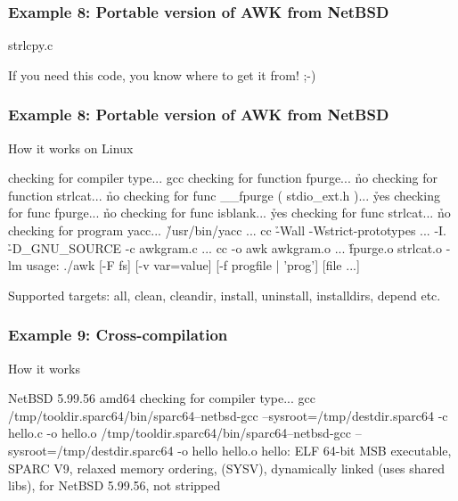 \documentclass[hyperref={colorlinks=true}]{beamer}
\begin{document}
\begin{frame}[fragile]
  \frametitle{Example 8: Portable version of AWK from NetBSD}

\begin{block}{strlcpy.c}
\begin{CodeNoLabel}
If you need this code, you know where to get it from! ;-)
\end{CodeNoLabel}
\end{block}
\end{frame}

\begin{frame}[fragile]
  \frametitle{Example 8: Portable version of AWK from NetBSD}

\begin{block}{How it works on Linux}
\begin{CodeNoLabel}
checking for compiler type... gcc
checking for function fpurge... \h{no}
checking for function strlcat... \h{no}
checking for func __fpurge ( stdio_ext.h )... \h{yes}
checking for func fpurge... \h{no}
checking for func isblank... \h{yes}
checking for func strlcat... \h{no}
checking for program yacc... \h{/usr/bin/yacc}
...
cc \h{-Wall -Wstrict-prototypes ...} 
    -I. \h{-D\_GNU\_SOURCE} -c awkgram.c
...
cc -o awk awkgram.o ... \h{fpurge.o strlcat.o} -lm
usage: ./awk [-F fs] [-v var=value] [-f progfile 
    | 'prog'] [file ...]
\prompt{\$}
\end{CodeNoLabel}
\end{block}
Supported targets: all, clean, cleandir, install,
uninstall, installdirs, depend etc.
\end{frame}

\begin{frame}[fragile]
  \frametitle{Example 9: Cross-compilation}

\begin{block}{How it works}
\begin{CodeNoLabel}
NetBSD 5.99.56 amd64
checking for compiler type... gcc
/tmp/tooldir.sparc64/bin/sparc64--netbsd-gcc
   --sysroot=/tmp/destdir.sparc64 -c hello.c -o hello.o
/tmp/tooldir.sparc64/bin/sparc64--netbsd-gcc
   --sysroot=/tmp/destdir.sparc64 -o hello hello.o
hello: ELF 64-bit MSB executable, SPARC V9, relaxed
   memory ordering, (SYSV), dynamically linked (uses
   shared libs), for NetBSD 5.99.56, not stripped
\prompt{\$ }
\end{CodeNoLabel}
\end{block}
\end{frame}
\end{document}
